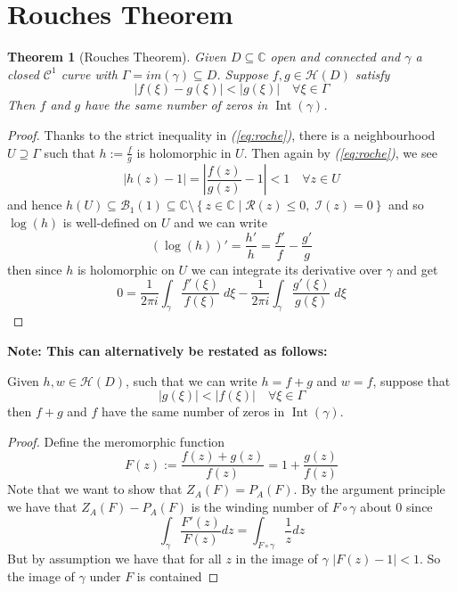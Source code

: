 \documentclass[11pt]{article}
\newcommand{\defeq}{:=}
\newcommand{\abs}[1]{\left|#1\right|}
\DeclareMathOperator{\Int}{\text{Int}}
\newcommand{\relmiddle}[1]{\mathrel{}\middle#1\mathrel{}}
\newcommand{\rmv}{\relmiddle|}
\newcommand{\C}{\mathbb{C}}
\newenvironment{note}
	{\begin{mdframed}[backgroundcolor=white, linecolor=red, roundcorner=5pt, linewidth=1pt]\bfseries{Note:}\normalfont}
	{\end{mdframed}}
\newtheorem{theorem}{Theorem}[section]
\begin{document}
\section{Rouches Theorem}

\begin{theorem}[Rouches Theorem]
Given $D\subseteq\C$ open and connected and $\gamma$ a closed $\mathcal{C}^1$ curve with $\Gamma=im(\gamma)\subseteq D$.
Suppose $f,g\in\mathcal{H}(D)$ satisfy
\begin{equation}
	\abs{f(\xi)-g(\xi)} < \abs{g(\xi)}\quad\forall\xi\in\Gamma	
	\label{eq:roche}
\end{equation}
Then $f$ and $g$ have the same number of zeros in $\Int(\gamma)$.
\end{theorem}

\begin{proof}
Thanks to the strict inequality in \textit{(\ref{eq:roche})}, there is a neighbourhood $U\supseteq \Gamma$ such that $h\defeq\frac{f}{g}$ is holomorphic in $U$.
Then again by \textit{(\ref{eq:roche})}, we see
\[
	\abs{h(z)-1}=\abs{\frac{f(z)}{g(z)}-1}<1 \quad \forall z\in U
\]
and hence $h(U)\subseteq \mathcal{B}_1(1) \subseteq \C\setminus\left\{z\in\C \rmv \mathcal{R}(z)\leq 0, \; \mathcal{I}(z)=0\right\}$ and so $\log(h)$ is well-defined on $U$ and we can write
\[
	(\log(h))'=\frac{h'}{h}=\frac{f'}{f}-\frac{g'}{g}
\]
then since $h$ is holomorphic on $U$ we can integrate its derivative over $\gamma$ and get
\[
	0=\frac{1}{2\pi i}\int_\gamma\frac{f'(\xi)}{f(\xi)}\;d\xi - \frac{1}{2\pi i}\int_\gamma\frac{g'(\xi)}{g(\xi)}\;d\xi
\]
\end{proof}

\begin{note}
This can alternatively be restated as follows:

Given $h,w\in\mathcal{H}(D)$, such that we can write $h=f+g$ and $w=f$, suppose that
\[
	\abs{g(\xi)} < \abs{f(\xi)} \quad \forall\xi\in\Gamma
\]
then $f+g$ and $f$ have the same number of zeros in $\Int(\gamma)$.
\end{note}

\begin{proof}
Define the meromorphic function
\[
	F(z)\defeq \frac{f(z) + g(z)}{f(z)} = 1 + \frac{g(z)}{f(z)}
\]
Note that we want to show that $Z_A(F) = P_A(F)$.
By the argument principle we have that $Z_A(F) - P_A(F)$ is the winding number of $F\circ \gamma$ about $0$ since
\[
	\int_\gamma \frac{F'(z)}{F(z)}dz = \int_{F\circ \gamma} \frac{1}{z}dz
\]
But by assumption we have that for all $z$ in the image of $\gamma$ $\abs{F(z)-1 } < 1$.
So the image of $\gamma$ under $F$ is contained 
\end{proof}
\end{document}
